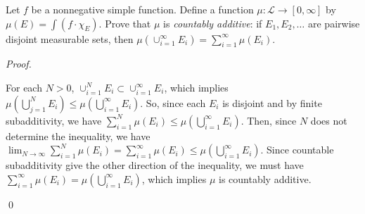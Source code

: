 \documentclass[12pt]{article}
\newenvironment{problem}[2][Problem]{\begin{trivlist}
\item[\hskip \labelsep {\bfseries #1}\hskip \labelsep {\bfseries
#2.}]}{\end{trivlist}}
\newenvironment{sol}
    {\emph{Proof.}
    }
    {
    \qed
    }
\begin{document}
\begin{problem}{46}
  Let $f$ be a nonnegative simple function. Define a function $\mu : \mathcal{L} \to [0,\infty]$ by $\mu(E) = \int(f \cdot \chi_E)$. Prove that $\mu$ is \textit{countably additive}: if $E_1, E_2, \dots$ are pairwise disjoint measurable sets, then $\mu(\cup_{i = 1}^{\infty}E_i) = \sum_{i = 1}^{\infty}\mu(E_i)$.
\end{problem}

\begin{sol}
  For each $N > 0$, $\cup_{i = 1}^{N}E_i \subset \cup_{i = 1}^{\infty}E_i$, which implies $\mu \left( \bigcup_{j=1}^{N} E_i \right) \leq \mu \left( \bigcup_{i = 1}^{\infty} E_i \right)$. So, since each $E_i$ is disjoint and by finite subadditivity, we have $\sum_{i = 1}^{N} \mu(E_i) \leq \mu \left( \bigcup_{i = 1}^{\infty} E_i \right)$. Then, since $N$ does not determine the inequality, we have $\lim_{N \to \infty} \sum_{i = 1}^{N} \mu(E_i) = \sum_{i = 1}^{\infty} \mu(E_i) \leq \mu \left( \bigcup_{i = 1}^{\infty} E_i \right)$. Since countable subadditivity give the other direction of the inequality, we must have $\sum_{i = 1}^{\infty} \mu(E_i) = \mu \left( \bigcup_{i = 1}^{\infty} E_i \right)$, which implies $\mu$ is countably additive.
\end{sol}
\end{document}
